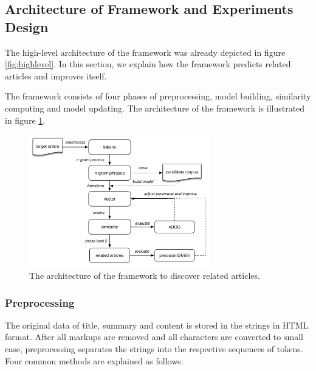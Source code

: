 \subsection{Architecture of Framework and Experiments Design}
\label{sec:4.3}

The high-level architecture of the framework was already depicted in figure \ref{fig:highlevel}. In this section, we explain how the framework predicts related articles and improves itself. 

The framework consists of four phases of preprocessing, model building, similarity computing and model updating. The architecture of the framework is illustrated in figure \ref{fig:unsupervised}. 

\begin{figure}[!htb]
    \centering
    \includegraphics[width=0.7\textwidth]{fig/unsupervise}
    \caption{The architecture of the framework to discover related articles.}
    \label{fig:unsupervised}
\end{figure}


\subsubsection{Preprocessing}
The original data of title, summary and content is stored in the strings in HTML format. After all markups are removed and all characters are converted to small case, preprocessing separates the strings into the respective sequences of tokens. Four common methods are explained as follows:


